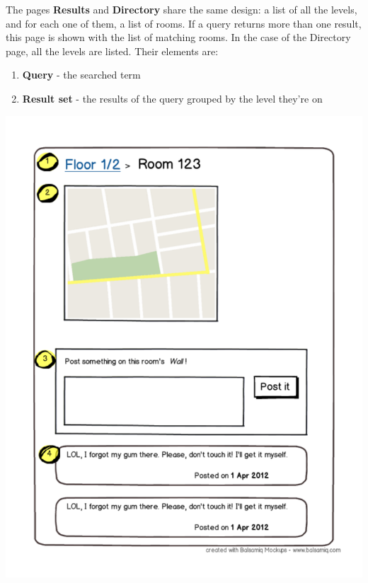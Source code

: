 \documentclass{sig-alt-release2}
\begin{document}
The pages \textbf{Results} and \textbf{Directory} share the same design:
a list of all the levels, and for each one of 
them, a list of rooms. If a query returns more than one result, this page is 
shown with the list of matching rooms. In the case of the Directory page, all 
the levels are listed. Their elements are:
\begin{enumerate} \itemsep1pt \parskip0pt 
	\item{\textbf{Query} - the searched term}
	\item{\textbf{Result set} - the results of the query grouped by the level
	they're on}
\end{enumerate}


\begin{center}
\includegraphics[scale=0.35]{img/wireframes/room.pdf}
\end{center}
\end{document}
